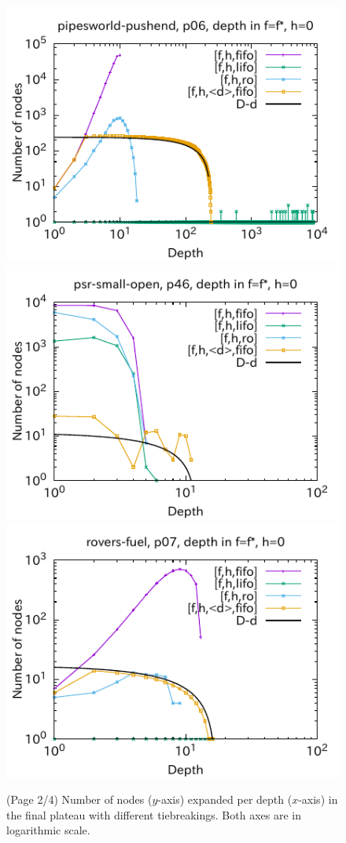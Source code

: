 \begin{figure}[htbp]
\includegraphics{img/output-lmcut/pipesworld-pushend/p06.pdf}
\includegraphics{img/output-lmcut/psr-small-open/p46.pdf}
\includegraphics{img/output-lmcut/rovers-fuel/p07.pdf}
 \caption{(Page 2/4) Number of nodes ($y$-axis) expanded per depth ($x$-axis) in
 the final plateau with different tiebreakings. Both axes are in logarithmic scale.
 }
 \label{fig:depth-histogram2}
\end{figure}

